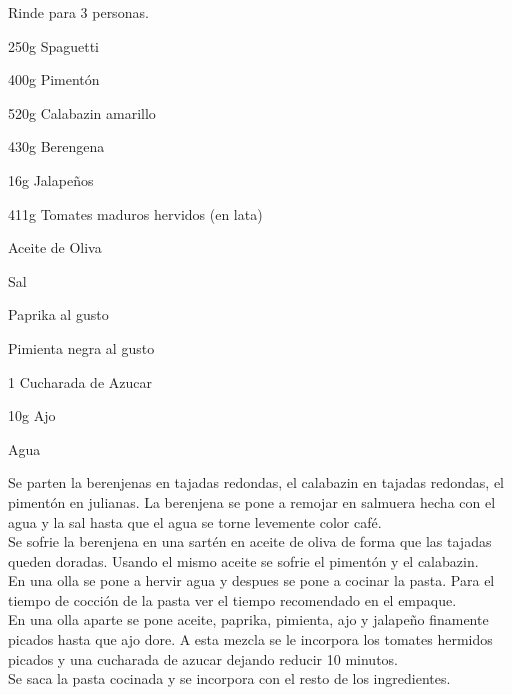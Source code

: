 
Rinde para 3 personas.\\

\begin{ingredientes}
\item 250g Spaguetti
\item 400g Pimentón
\item 520g Calabazin amarillo
\item 430g Berengena
\item 16g Jalapeños
\item 411g Tomates maduros hervidos (en lata)
\item Aceite de Oliva
\item Sal
\item Paprika al gusto
\item Pimienta negra al gusto
\item 1 Cucharada de Azucar
\item 10g Ajo
\item Agua
\end{ingredientes}
\preparacion
Se parten la berenjenas en tajadas redondas, el calabazin en tajadas redondas, el pimentón en julianas. La berenjena se pone a remojar en salmuera hecha con el agua y la sal hasta que el agua se torne levemente color café.\\

Se sofrie la berenjena en una sartén en aceite de oliva de forma que las tajadas queden doradas. Usando el mismo aceite se sofrie el pimentón y el calabazin.\\

En una olla se pone a hervir agua y despues se pone a cocinar la pasta. Para el tiempo de cocción de la pasta ver el tiempo recomendado en el empaque.\\

En una olla aparte se pone aceite, paprika, pimienta, ajo y jalapeño finamente picados  hasta que ajo dore. A esta mezcla se le incorpora los tomates hermidos picados y una cucharada de azucar dejando reducir 10 minutos.\\

Se saca la pasta cocinada y se incorpora con el resto de los ingredientes.
